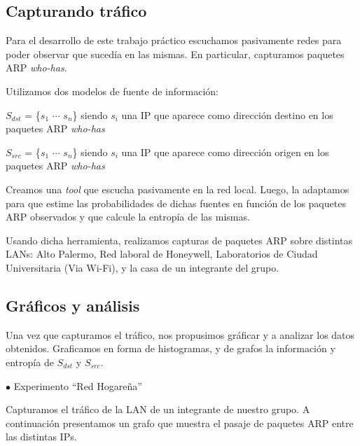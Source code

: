 \documentclass[10pt, a4paper]{article}
\begin{document}
\subsection{Capturando tráfico}
Para el desarrollo de este trabajo práctico escuchamos pasivamente redes para poder observar que sucedía en las mismas. En particular, capturamos paquetes ARP \emph{who-has}.

Utilizamos dos modelos de fuente de información:

$S_{dst}$ = \{$s_1$ $\cdots$ $s_n$\} siendo $s_i$ una IP que aparece como dirección destino en los paquetes ARP \emph{who-has}

$S_{src}$ = \{$s_1$ $\cdots$ $s_n$\} siendo $s_i$ una IP que aparece como dirección origen en los paquetes ARP \emph{who-has}

Creamos una \emph{tool} que escucha pasivamente en la red local. Luego, la adaptamos para que estime las probabilidades de dichas fuentes en función de los paquetes ARP observados y que calcule la entropía de las mismas.

Usando dicha herramienta, realizamos capturas de paquetes ARP sobre distintas LANs: Alto Palermo, Red laboral de Honeywell, Laboratorios de Ciudad Universitaria (Via Wi-Fi), y la casa de un integrante del grupo.

\subsection{Gráficos y análisis}
Una vez que capturamos el tráfico, nos propusimos gráficar y a analizar los datos obtenidos. Graficamos en forma de histogramas, y de grafos la información y entropía de $S_{dst}$ y $S_{src}$.

$\bullet$ Experimento ``Red Hogareña''

Capturamos el tráfico de la LAN de un integrante de nuestro grupo. A continuación presentamos un grafo que muestra el pasaje de paquetes ARP entre las distintas IPs.
\end{document}
